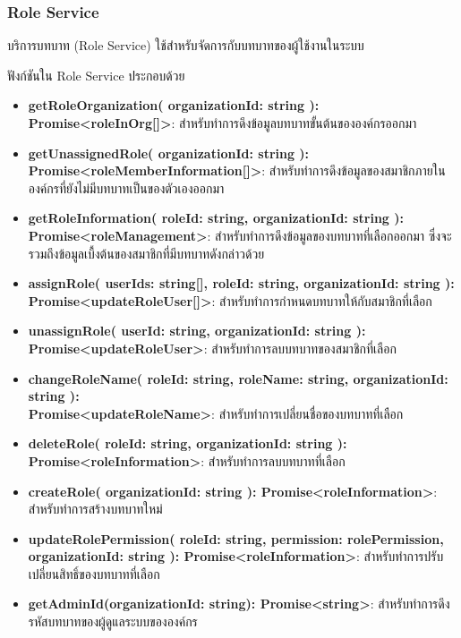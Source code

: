 \subsubsection{Role Service}

\ifenglish
\else
บริการบทบาท (Role Service) ใช้สำหรับจัดการกับบทบาทของผู้ใช้งานในระบบ 

ฟังก์ชันใน Role Service ประกอบด้วย
\begin{itemize}
    \item \textbf{getRoleOrganization(
        organizationId: string
      ): Promise<roleInOrg[]>}: สำหรับทำการดึงข้อมูลบทบาทขั้นต้นขององค์กรออกมา
    \item \textbf{getUnassignedRole(
        organizationId: string
      ): \\Promise<roleMemberInformation[]>}: สำหรับทำการดึงข้อมูลของสมาชิกภายในองค์กรที่ยังไม่มีบทบาทเป็นของตัวเองออกมา
    \item \textbf{getRoleInformation(
        roleId: string,
        organizationId: string
      ):\\Promise<roleManagement>}: สำหรับทำการดึงข้อมูลของบทบาทที่เลือกออกมา ซึ่งจะรวมถึงข้อมูลเบื้งต้นของสมาชิกที่มีบทบาทดังกล่าวด้วย
    \item \textbf{assignRole(
        userIds: string[],
        roleId: string,
        organizationId: string
      ): \\Promise<updateRoleUser[]>}: สำหรับทำการกำหนดบทบาทให้กับสมาชิกที่เลือก
    \item \textbf{unassignRole(
        userId: string,
        organizationId: string
      ): \\Promise<updateRoleUser>}: สำหรับทำการลบบทบาทของสมาชิกที่เลือก
    \item \textbf{changeRoleName(
        roleId: string,
        roleName: string,
        organizationId: string
      ): \\Promise<updateRoleName>}: สำหรับทำการเปลี่ยนชื่อของบทบาทที่เลือก
    \item \textbf{deleteRole(
        roleId: string,
        organizationId: string
      ): Promise<roleInformation>}: สำหรับทำการลบบทบาทที่เลือก
    \item \textbf{createRole(
        organizationId: string
      ): Promise<roleInformation>}: สำหรับทำการสร้างบทบาทใหม่
    \item \textbf{updateRolePermission(
        roleId: string,
        permission: rolePermission,\\
        organizationId: string
      ): Promise<roleInformation>}: สำหรับทำการปรับเปลี่ยนสิทธิ์ของบทบาทที่เลือก
    \item \textbf{getAdminId(organizationId: string): Promise<string>}: สำหรับทำการดึงรหัสบทบาทของผู้ดูแลระบบขององค์กร
\end{itemize}

